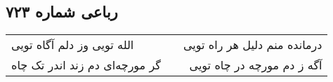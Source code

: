 \begin{center}
\section*{رباعی شماره ۷۲۳}
\label{sec:sh723}
\begin{longtable}{l p{0.5cm} r}
الله تویی وز دلم آگاه تویی
&&
درمانده منم دلیل هر راه تویی
\\
گر مورچه‌ای دم زند اندر تک چاه
&&
آگه ز دم مورچه در چاه تویی
\\
\end{longtable}
\end{center}
